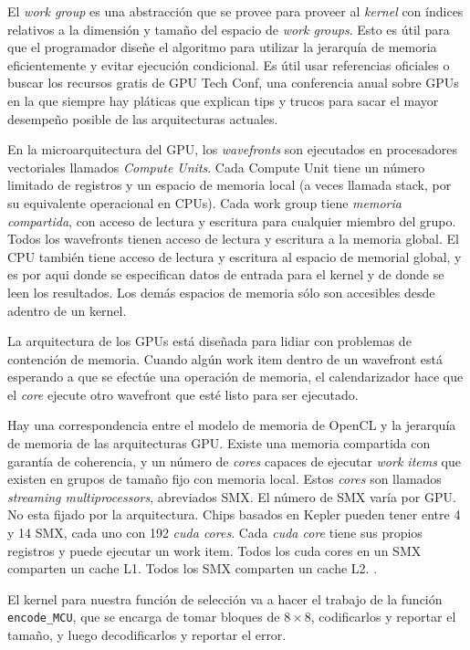 El \emph{work group} es una abstracción que se provee para proveer al
\emph{kernel} con índices relativos a la dimensión y tamaño del espacio de
\emph{work groups}. Esto es útil para que el programador diseñe el algoritmo
para utilizar la jerarquía de memoria eficientemente y evitar ejecución
condicional. Es útil usar referencias oficiales \cite{maxwell-tuning} o buscar
los recursos gratis de GPU Tech Conf, una conferencia anual sobre GPUs en la
que siempre hay pláticas que explican tips y trucos para sacar el mayor
desempeño posible de las arquitecturas actuales. \cite{gtc}


En la microarquitectura del GPU, los \emph{wavefronts} son ejecutados en
procesadores vectoriales llamados \emph{Compute Units}. Cada Compute Unit tiene
un número limitado de registros y un espacio de memoria local (a veces llamada
stack, por su equivalente operacional en CPUs). Cada work group tiene
\emph{memoria compartida}, con acceso de lectura y escritura para cualquier
miembro del grupo. Todos los wavefronts tienen acceso de lectura y escritura a
la memoria global. El CPU también tiene acceso de lectura y escritura al
espacio de memorial global, y es por aqui donde se especifican datos de entrada
para el kernel y de donde se leen los resultados.  Los demás espacios de
memoria sólo son accesibles desde adentro de un kernel.

La arquitectura de los GPUs está diseñada para lidiar con problemas de
contención de memoria. Cuando algún work item dentro de un wavefront está
esperando a que se efectúe una operación de memoria, el calendarizador hace que
el \emph{core} ejecute otro wavefront que esté listo para ser ejecutado.

Hay una correspondencia entre el modelo de memoria de OpenCL y la jerarquía de
memoria de las arquitecturas GPU. Existe una memoria compartida con garantía de
coherencia, y un número de \emph{cores} capaces de ejecutar \emph{work items}
que existen en grupos de tamaño fijo con memoria local. Estos \emph{cores} son
llamados \emph{streaming multiprocessors}, abreviados SMX. El número de SMX
varía por GPU. No esta fijado por la arquitectura. Chips basados en Kepler
pueden tener entre 4 y 14 SMX, cada uno con 192 \emph{cuda cores}. Cada
\emph{cuda core} tiene sus propios registros y puede ejecutar un work item. Todos
los cuda cores en un SMX comparten un cache L1. Todos los SMX comparten un
cache L2. \cite{kepler-notes}.

El kernel para nuestra función de selección va a hacer el trabajo de la función
\verb+encode_MCU+, que se encarga de tomar bloques de $8\times8$, codificarlos
y reportar el tamaño, y luego decodificarlos y reportar el error.

